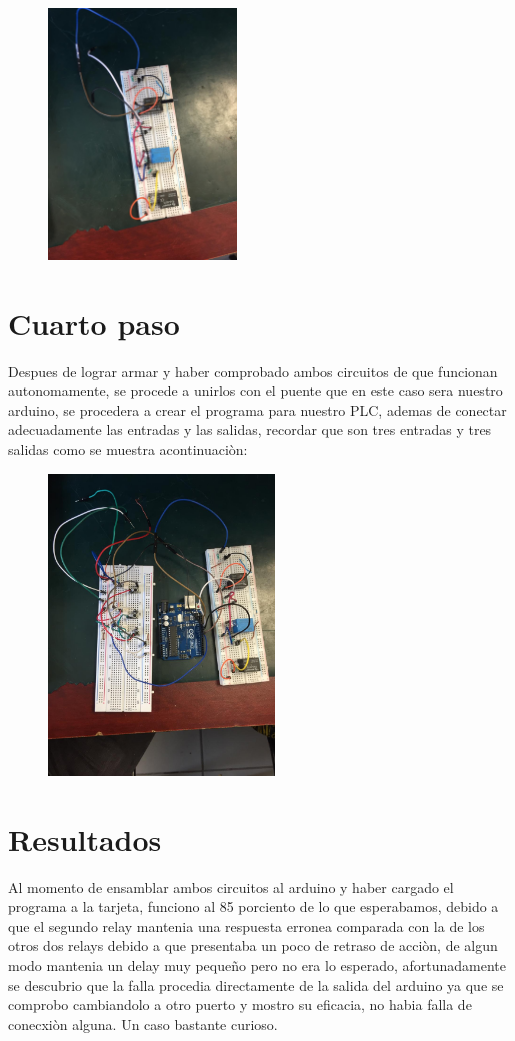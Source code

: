 \documentclass[12pt,a4paper]{article}
\begin{document}
\begin{figure}[h!]
\centering
\includegraphics[width=5cm]{IMG-20191004-WA0004.jpg} 
\end{figure}

\section{Cuarto paso}
Despues de lograr armar y haber comprobado ambos circuitos de que funcionan autonomamente, se procede a unirlos con el puente que en este caso sera nuestro arduino, se procedera a crear el programa para nuestro PLC, ademas de conectar adecuadamente las entradas y las salidas, recordar que son tres entradas y tres salidas como se muestra acontinuaciòn:

\begin{figure}[h!]
\centering
\includegraphics[width=6cm]{IMG-20191004-WA0003.jpg} 
\end{figure}

\section{Resultados}
Al momento de ensamblar ambos circuitos al arduino y haber cargado el programa a la tarjeta, funciono al 85 porciento de lo que esperabamos, debido a que el segundo relay mantenia una respuesta erronea comparada con la de los otros dos relays debido a que presentaba un poco de retraso de acciòn, de algun modo mantenia un delay muy pequeño pero no era lo esperado, afortunadamente se descubrio que la falla procedia directamente de la salida del arduino ya que se comprobo cambiandolo a otro puerto y mostro su eficacia, no habia falla de conecxiòn alguna. Un caso bastante curioso.
\end{document}
